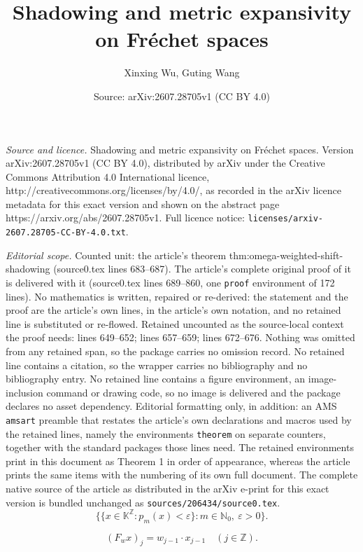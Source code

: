 \documentclass[10pt,a4paper]{amsart}
\title{Shadowing and metric expansivity on Fr\'echet spaces}
\author{Xinxing Wu, Guting Wang}
\date{Source: arXiv:2607.28705v1 (CC BY 4.0)}
\begin{document}
\maketitle

\noindent\emph{Source and licence.} Shadowing and metric expansivity on Fr\'echet spaces. Version arXiv:2607.28705v1 (CC BY 4.0), distributed by arXiv under the Creative Commons Attribution 4.0 International licence, http://creativecommons.org/licenses/by/4.0/, as recorded in the arXiv licence metadata for this exact version and shown on the abstract page https://arxiv.org/abs/2607.28705v1. Full licence notice: \texttt{licenses/arxiv-2607.28705-CC-BY-4.0.txt}.\par\smallskip

\noindent\textit{Editorial scope.} Counted unit: the article's theorem thm:omega-weighted-shift-shadowing (source0.tex lines 683--687). The article's complete original proof of it is delivered with it (source0.tex lines 689--860, one \texttt{proof} environment of 172 lines). No mathematics is written, repaired or re-derived: the statement and the proof are the article's own lines, in the article's own notation, and no retained line is substituted or re-flowed.  Retained uncounted as the source-local context the proof needs: lines 649--652; lines 657--659; lines 672--676.  Nothing was omitted from any retained span, so the package carries no omission record.  No retained line contains a citation, so the wrapper carries no bibliography and no bibliography entry.  No retained line contains a figure environment, an image-inclusion command or drawing code, so no image is delivered and the package declares no asset dependency.  Editorial formatting only, in addition: an AMS \texttt{amsart} preamble that restates the article's own declarations and macros used by the retained lines, namely the environments \texttt{theorem} on separate counters, together with the standard packages those lines need.  The retained environments print in this document as Theorem 1 in order of appearance, whereas the article prints the same items with the numbering of its own full document.  The complete native source of the article as distributed in the arXiv e-print for this exact version is bundled unchanged as \texttt{sources/206434/source0.tex}.
\begin{equation}\label{eq:local_base_0}
\{\{x\in\mathbb{K}^{\mathbb{Z}}:p_m(x)<\varepsilon\}:
m\in\mathbb{N}_0,\ \varepsilon>0\}.
\end{equation}

\begin{equation}\label{eq:Def-bilateral_weighted_forward_shift}
(F_w x)_j=w_{j-1}\cdot x_{j-1}\quad(j\in\mathbb{Z}).
\end{equation}
\end{document}
